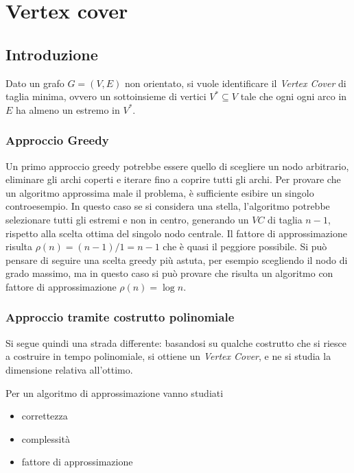 \section{Vertex cover}

\subsection{Introduzione}

Dato un grafo $G=(V,E)$ non orientato, si vuole identificare il \emph{Vertex Cover} di taglia minima, ovvero un sottoinsieme di vertici $V^* \subseteq V$ tale che ogni ogni arco in $E$ ha almeno un estremo in $V^*$.

\subsubsection{Approccio Greedy}

Un primo approccio greedy potrebbe essere quello di scegliere un nodo arbitrario, eliminare gli archi coperti e iterare fino a coprire tutti gli archi.
Per provare che un algoritmo approssima male il problema, è sufficiente esibire un singolo controesempio.
In questo caso se si considera una stella, l'algoritmo potrebbe selezionare tutti gli estremi e non in centro, generando un $VC$ di taglia $n-1$, rispetto alla scelta ottima del singolo nodo centrale.
Il fattore di approssimazione risulta $
\rho (n) = 
(n-1)/1 = n-1
$ che è quasi il peggiore possibile.
Si può pensare di seguire una scelta greedy più astuta, per esempio scegliendo il nodo di grado massimo, ma in questo caso si può provare che risulta un algoritmo con fattore di approssimazione $
\rho (n) = \log n
$.

\subsubsection{Approccio tramite costrutto polinomiale}

Si segue quindi una strada differente: basandosi su qualche costrutto che si riesce a costruire in tempo polinomiale, si ottiene un \emph{Vertex Cover}, e ne si studia la dimensione relativa all'ottimo.

Per un algoritmo di approssimazione vanno studiati
\begin{itemize}[noitemsep,parsep=0pt,partopsep=0pt,topsep=0pt]
    \item correttezza
    \item complessità
    \item fattore di approssimazione
\end{itemize}

